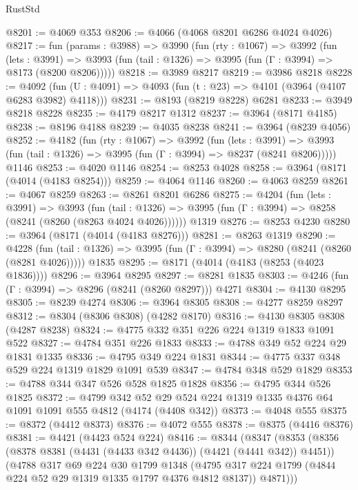 \begin{lexlean}{RustStd}
\begin{coremodule}
@8201 := @4069 @353
@8206 := @4066 (@4068 @8201 @6286 @4024 @4026)
@8217 := fun (params : @3988) =>
  @3990
    (fun (rty : @1067) =>
    @3992
      (fun (lets : @3991) =>
      @3993 (fun (tail : @1326) => @3995 (fun (Γ : @3994) => @8173 (@8200 @8206)))))
@8218 := @3989 @8217
@8219 := @3986 @8218
@8228 := @4092 (fun (U : @4091) => @4093 (fun (t : @23) => @4101 (@3964 (@4107 @6283 @3982) @4118)))
@8231 := @8193 (@8219 @8228) @6281
@8233 := @3949 @8218 @8228
@8235 := @4179 @8217 @1312
@8237 := @3964 (@8171 @4185)
@8238 := @8196 @4188
@8239 := @4035 @8238
@8241 := @3964 (@8239 @4056)
@8252 := @4182
    (fun (rty : @1067) =>
    @3992
      (fun (lets : @3991) =>
      @3993 (fun (tail : @1326) => @3995 (fun (Γ : @3994) => @8237 (@8241 @8206)))))
    @1146
@8253 := @4020 @1146
@8254 := @8253 @4028
@8258 := @3964 (@8171 (@4014 (@4183 @8254)))
@8259 := @4064 @1146
@8260 := @4063 @8259
@8261 := @4067 @8259
@8263 := @8261 @8201 @6286
@8275 := @4204
    (fun (lets : @3991) =>
    @3993
      (fun (tail : @1326) => @3995 (fun (Γ : @3994) => @8258 (@8241 (@8260 (@8263 @4024 @4026))))))
    @1319
@8276 := @8253 @4230
@8280 := @3964 (@8171 (@4014 (@4183 @8276)))
@8281 := @8263 @1319
@8290 := @4228
    (fun (tail : @1326) => @3995 (fun (Γ : @3994) => @8280 (@8241 (@8260 (@8281 @4026)))))
    @1835
@8295 := @8171 (@4014 (@4183 (@8253 (@4023 @1836))))
@8296 := @3964 @8295
@8297 := @8281 @1835
@8303 := @4246 (fun (Γ : @3994) => @8296 (@8241 (@8260 @8297))) @4271
@8304 := @4130 @8295
@8305 := @8239 @4274
@8306 := @3964 @8305
@8308 := @4277 @8259 @8297
@8312 := @8304 (@8306 @8308) (@4282 @8170)
@8316 := @4130 @8305 @8308 (@4287 @8238)
@8324 := @4775 @332 @351 @226 @224 @1319 @1833 @1091 @522
@8327 := @4784 @351 @226 @1833
@8333 := @4788 @349 @52 @224 @29 @1831 @1335
@8336 := @4795 @349 @224 @1831
@8344 := @4775 @337 @348 @529 @224 @1319 @1829 @1091 @539
@8347 := @4784 @348 @529 @1829
@8353 := @4788 @344 @347 @526 @528 @1825 @1828
@8356 := @4795 @344 @526 @1825
@8372 := @4799
    @342
    @52
    @29
    @524
    @224
    @1319
    @1335
    @4376
    @64
    @1091
    @1091
    @555
    @4812
    (@4174 (@4408 @342))
@8373 := @4048 @555
@8375 := @8372 (@4412 @8373)
@8376 := @4072 @555
@8378 := @8375 (@4416 @8376)
@8381 := @4421 (@4423 @524 @224)
@8416 := @8344
    (@8347
      (@8353
        (@8356 (@8378 @8381 (@4431 (@4433 @342 @4436)) (@4421 (@4441 @342)) @4451))
        (@4788
          @317
          @69
          @224
          @30
          @1799
          @1348
          (@4795 @317 @224 @1799 (@4844 @224 @52 @29 @1319 @1335 @1797 @4376 @4812 @8137))
          @4871)))

\end{coremodule}
\end{lexlean}
